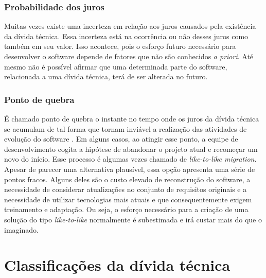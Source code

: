 \subsubsection{Probabilidade dos juros}

Muitas vezes existe uma incerteza em relação aos juros causados pela existência da dívida técnica. Essa incerteza está na ocorrência ou não desses juros como também em seu valor.  
Isso acontece, pois o esforço futuro necessário para desenvolver o software depende de fatores que não são conhecidos \textit{a priori}. Até mesmo não é possível afirmar que uma determinada parte do software, relacionada a uma dívida técnica, terá de ser alterada no futuro. 

\subsubsection{Ponto de quebra}

É chamado ponto de quebra o instante no tempo onde os juros da dívida técnica se acumulam de tal forma que tornam inviável a realização das atividades de evolução do software \cite{chatzigeorgiou2015estimating}. Em alguns casos, ao atingir esse ponto, a equipe de desenvolvimento cogita a hipótese de abandonar o projeto atual e recomeçar um novo do início. Esse processo é algumas vezes chamado de \textit{like-to-like migration}.  Apesar de parecer uma alternativa plausível, essa opção apresenta uma série de pontos fracos. Alguns deles são o custo elevado de reconstrução do software, a necessidade de considerar atualizações no conjunto de requisitos originais e a necessidade de utilizar tecnologias mais atuais e que consequentemente exigem treinamento e adaptação\cite{sterling2010managing}. Ou seja, o esforço necessário para a criação de uma solução do tipo \textit{like-to-like} normalmente é subestimada e irá custar mais do que o imaginado. 
 

\section{Classificações da dívida técnica}
\label{classificacoes_divida_tecnica}


